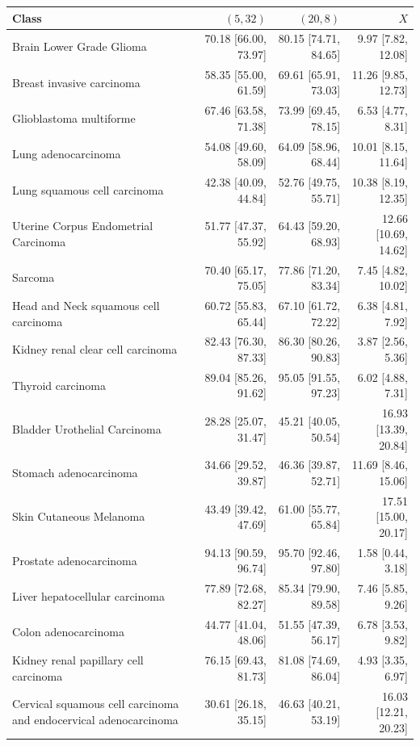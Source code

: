 \begin{tabular}{@{}p{6cm}rrr@{}}
\toprule
Class & $(5, 32)$ & $(20, 8)$ & $X$ \\
\midrule
Brain Lower Grade Glioma & 70.18 [66.00, 73.97] & 80.15 [74.71, 84.65] & 9.97 [7.82, 12.08] \\
Breast invasive carcinoma & 58.35 [55.00, 61.59] & 69.61 [65.91, 73.03] & 11.26 [9.85, 12.73] \\
Glioblastoma multiforme & 67.46 [63.58, 71.38] & 73.99 [69.45, 78.15] & 6.53 [4.77, 8.31] \\
Lung adenocarcinoma & 54.08 [49.60, 58.09] & 64.09 [58.96, 68.44] & 10.01 [8.15, 11.64] \\
Lung squamous cell carcinoma & 42.38 [40.09, 44.84] & 52.76 [49.75, 55.71] & 10.38 [8.19, 12.35] \\
Uterine Corpus Endometrial Carcinoma & 51.77 [47.37, 55.92] & 64.43 [59.20, 68.93] & 12.66 [10.69, 14.62] \\
Sarcoma & 70.40 [65.17, 75.05] & 77.86 [71.20, 83.34] & 7.45 [4.82, 10.02] \\
Head and Neck squamous cell carcinoma & 60.72 [55.83, 65.44] & 67.10 [61.72, 72.22] & 6.38 [4.81, 7.92] \\
Kidney renal clear cell carcinoma & 82.43 [76.30, 87.33] & 86.30 [80.26, 90.83] & 3.87 [2.56, 5.36] \\
Thyroid carcinoma & 89.04 [85.26, 91.62] & 95.05 [91.55, 97.23] & 6.02 [4.88, 7.31] \\
Bladder Urothelial Carcinoma & 28.28 [25.07, 31.47] & 45.21 [40.05, 50.54] & 16.93 [13.39, 20.84] \\
Stomach adenocarcinoma & 34.66 [29.52, 39.87] & 46.36 [39.87, 52.71] & 11.69 [8.46, 15.06] \\
Skin Cutaneous Melanoma & 43.49 [39.42, 47.69] & 61.00 [55.77, 65.84] & 17.51 [15.00, 20.17] \\
Prostate adenocarcinoma & 94.13 [90.59, 96.74] & 95.70 [92.46, 97.80] & 1.58 [0.44, 3.18] \\
Liver hepatocellular carcinoma & 77.89 [72.68, 82.27] & 85.34 [79.90, 89.58] & 7.46 [5.85, 9.26] \\
Colon adenocarcinoma & 44.77 [41.04, 48.06] & 51.55 [47.39, 56.17] & 6.78 [3.53, 9.82] \\
Kidney renal papillary cell carcinoma & 76.15 [69.43, 81.73] & 81.08 [74.69, 86.04] & 4.93 [3.35, 6.97] \\
Cervical squamous cell carcinoma and endocervical adenocarcinoma & 30.61 [26.18, 35.15] & 46.63 [40.21, 53.19] & 16.03 [12.21, 20.23] \\

\end{tabular}
